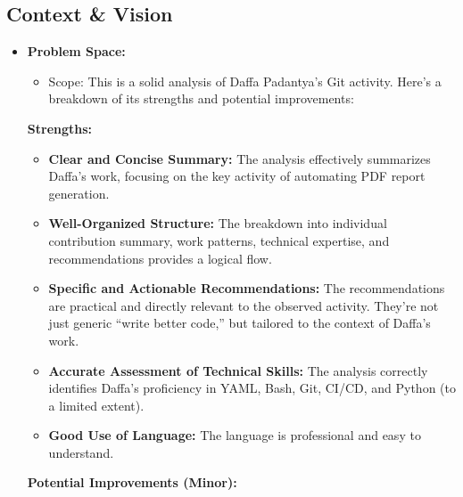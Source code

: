 \documentclass{article}
\begin{document}
\subsection{Context \& Vision}
\begin{itemize}
    \item \textbf{Problem Space:}
    \begin{itemize}
        \item Scope: This is a solid analysis of Daffa Padantya's Git activity.  Here's a breakdown of its strengths and potential improvements:
    \end{itemize}

\textbf{Strengths:}

\begin{itemize}
    \item \textbf{Clear and Concise Summary:} The analysis effectively summarizes Daffa's work, focusing on the key activity of automating PDF report generation.
    \item \textbf{Well-Organized Structure:} The breakdown into individual contribution summary, work patterns, technical expertise, and recommendations provides a logical flow.
    \item \textbf{Specific and Actionable Recommendations:} The recommendations are practical and directly relevant to the observed activity.  They're not just generic ``write better code,'' but tailored to the context of Daffa's work.
    \item \textbf{Accurate Assessment of Technical Skills:} The analysis correctly identifies Daffa's proficiency in YAML, Bash, Git, CI/CD, and Python (to a limited extent).
    \item \textbf{Good Use of Language:} The language is professional and easy to understand.
\end{itemize}

\textbf{Potential Improvements (Minor):}


\end{itemize}
\end{document}
